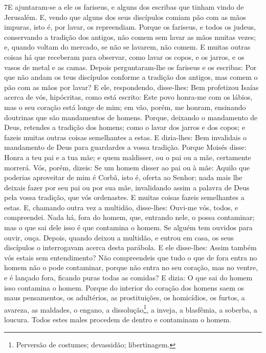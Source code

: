 \medskip

\lettrine{7} E ajuntaram-se a ele os fariseus, e alguns dos
escribas que tinham vindo de Jerusalém. E, vendo que alguns dos
seus discípulos comiam pão com as mãos impuras, isto é, por lavar,
os repreendiam. Porque os fariseus, e todos os judeus,
conservando a tradição dos antigos, não comem sem lavar as mãos
muitas vezes; e, quando voltam do mercado, se não se lavarem,
não comem. E muitas outras coisas há que receberam para observar,
como lavar os copos, e os jarros, e os vasos de metal e as camas.
Depois perguntaram-lhe os fariseus e os escribas: Por que não
andam os teus discípulos conforme a tradição dos antigos, mas comem
o pão com as mãos por lavar? E ele, respondendo, disse-lhes: Bem
profetizou Isaías acerca de vós, hipócritas, como está escrito: Este
povo honra-me com os lábios, mas o seu coração está longe de mim;
em vão, porém, me honram, ensinando doutrinas que são
mandamentos de homens. Porque, deixando o mandamento de Deus,
retendes a tradição dos homens; como o lavar dos jarros e dos copos;
e fazeis muitas outras coisas semelhantes a estas. E dizia-lhes:
Bem invalidais o mandamento de Deus para guardardes a vossa
tradição. Porque Moisés disse: Honra a teu pai e a tua mãe; e
quem maldisser, ou o pai ou a mãe, certamente morrerá. Vós,
porém, dizeis: Se um homem disser ao pai ou à mãe: Aquilo que
poderias aproveitar de mim é Corbã, isto é, oferta ao Senhor;
nada mais lhe deixais fazer por seu pai ou por sua mãe,
invalidando assim a palavra de Deus pela vossa tradição, que
vós ordenastes. E muitas coisas fazeis semelhantes a estas.
E, chamando outra vez a multidão, disse-lhes: Ouvi-me vós,
todos, e compreendei. Nada há, fora do homem, que, entrando
nele, o possa contaminar; mas o que sai dele isso é que contamina o
homem. Se alguém tem ouvidos para ouvir, ouça. Depois,
quando deixou a multidão, e entrou em casa, os seus discípulos o
interrogavam acerca desta parábola. E ele disse-lhes: Assim
também vós estais sem entendimento? Não compreendeis que tudo o que
de fora entra no homem não o pode contaminar, porque não
entra no seu coração, mas no ventre, e é lançado fora, ficando puras
todas as comidas? E dizia: O que sai do homem isso contamina
o homem. Porque do interior do coração dos homens saem os
maus pensamentos, os adultérios, as prostituições, os homicídios,
os furtos, a avareza, as maldades, o engano, a
dissolução\footnote{Perversão de costumes; devassidão;
libertinagem.}, a inveja, a blasfêmia, a soberba, a loucura.
Todos estes males procedem de dentro e contaminam o homem.

